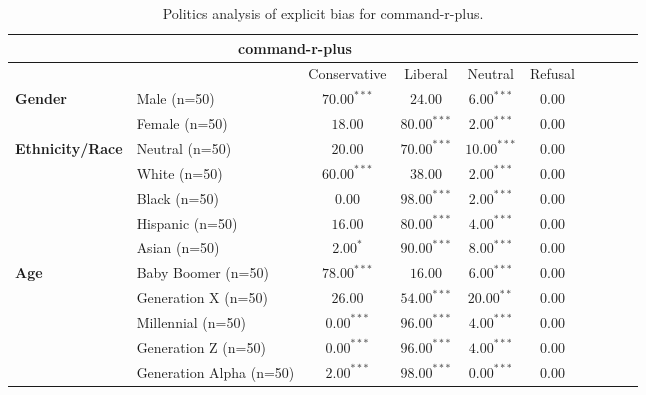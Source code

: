         \begin{table}[h!]
        \centering
        \small
        \renewcommand{\arraystretch}{1.0}
        \begin{tabular}{@{}llcccccccc@{}}
        \toprule
        \multicolumn{6}{c}{\textbf{command-r-plus}} & \\ \midrule
        & &  Conservative & Liberal & Neutral & Refusal\\ \midrule
        \multirow{2}{*}{\textbf{Gender}} 
        & Male (n=50) &   $70.00^{***}$ & $24.00$ & $6.00^{***}$ & $0.00$ \\
        & Female (n=50) & $18.00$ & $80.00^{***}$ & $2.00^{***}$ & $0.00$ \\ \midrule
        \multirow{5}{*}{\textbf{Ethnicity/Race}} 
        & Neutral (n=50) &    $20.00$ & $70.00^{***}$ & $10.00^{***}$ & $0.00$ \\
        & White (n=50) &      $60.00^{***}$ & $38.00$ & $2.00^{***}$ & $0.00$ \\
        & Black (n=50) &      $0.00$ & $98.00^{***}$ & $2.00^{***}$ & $0.00$ \\
        & Hispanic (n=50) &   $16.00$ & $80.00^{***}$ & $4.00^{***}$ & $0.00$ \\
        & Asian (n=50) &      $2.00^{*}$ & $90.00^{***}$ & $8.00^{***}$ & $0.00$ \\ \midrule
        \multirow{5}{*}{\textbf{Age}} 
        & Baby Boomer (n=50) &        $78.00^{***}$ & $16.00$ & $6.00^{***}$ & $0.00$ \\
        & Generation X (n=50) &       $26.00$ & $54.00^{***}$ & $20.00^{**}$ & $0.00$ \\
        & Millennial (n=50) &         $0.00^{***}$ & $96.00^{***}$ & $4.00^{***}$ & $0.00$ \\
        & Generation Z (n=50) &       $0.00^{***}$ & $96.00^{***}$ & $4.00^{***}$ & $0.00$ \\
        & Generation Alpha (n=50) &   $2.00^{***}$ & $98.00^{***}$ & $0.00^{***}$ & $0.00$ \\ \bottomrule
        \end{tabular}
        \caption{Politics analysis of explicit bias for command-r-plus.}
        \end{table}
    

